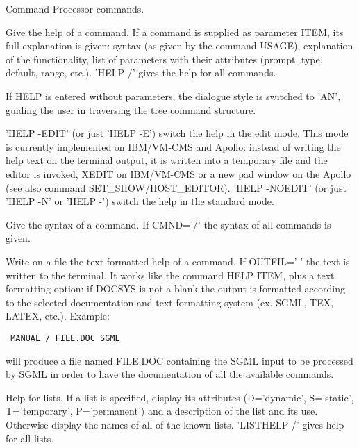 \BEGTEXT
Command Processor commands.
\ENDTEXT

\BEGARG
{}
\ENDARG
\BEGTEXT
Give the help of a command.
If a command is supplied as parameter ITEM, its full explanation is given:
syntax (as given by the command USAGE), explanation of the functionality,
list of parameters with their attributes (prompt, type, default, range, etc.).
'HELP /' gives the help for all commands.

If HELP is entered without parameters, the dialogue style is switched
to 'AN', guiding the user in traversing the tree command structure.

'HELP -EDIT' (or just 'HELP -E') switch the help in the edit mode.
This mode is currently implemented on IBM/VM-CMS and Apollo:
instead of writing the help text on the terminal output,
it is written into a temporary file and the editor is invoked,
XEDIT on IBM/VM-CMS or a new pad window on the Apollo
(see also command SET\_SHOW/HOST\_EDITOR).
'HELP -NOEDIT' (or just 'HELP -N' or 'HELP -') switch the help in
the standard mode.
\ENDTEXT

\BEGARG
{}
\ENDARG
\BEGTEXT
Give the syntax of a command.
If CMND='/' the syntax of all commands is given.
\ENDTEXT

\BEGARG
{}
\ENDARG
\BEGTEXT
Write on a file the text formatted help of a command.
If OUTFIL=' ' the text is written to the terminal.
It works like the command HELP ITEM, plus a text formatting option:
if DOCSYS is not a blank the output is formatted according to the selected
documentation and text formatting system (ex. SGML, TEX, LATEX, etc.).
Example:
\begin{verbatim}
 MANUAL / FILE.DOC SGML
\end{verbatim}
will produce a file named FILE.DOC
containing the SGML input to be processed
by SGML in order to have the documentation of all the available commands.
\ENDTEXT

\BEGARG
{}
\ENDARG
\BEGTEXT
Help for lists.
If a list is specified, display its attributes (D='dynamic', S='static',
T='temporary', P='permanent') and a description of the list and its use.
Otherwise display the names of all of the known lists.
'LISTHELP /' gives help for all lists.
\ENDTEXT

